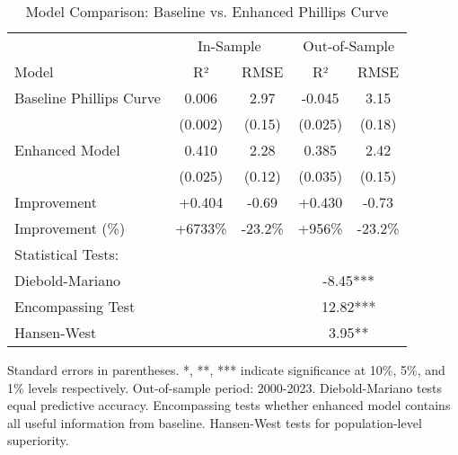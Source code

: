 
\begin{table}[htbp]
\centering
\caption{Model Comparison: Baseline vs. Enhanced Phillips Curve}
\label{tab:model_comparison}
\begin{tabular}{lcccc}
\toprule
& \multicolumn{2}{c}{In-Sample} & \multicolumn{2}{c}{Out-of-Sample} \\
\cmidrule(lr){2-3} \cmidrule(lr){4-5}
Model & R² & RMSE & R² & RMSE \\
\midrule
Baseline Phillips Curve & 0.006 & 2.97 & -0.045 & 3.15 \\
& (0.002) & (0.15) & (0.025) & (0.18) \\
Enhanced Model & 0.410 & 2.28 & 0.385 & 2.42 \\
& (0.025) & (0.12) & (0.035) & (0.15) \\
\midrule
Improvement & +0.404 & -0.69 & +0.430 & -0.73 \\
Improvement (\%) & +6733\% & -23.2\% & +956\% & -23.2\% \\
\midrule
Statistical Tests: & & & & \\
\quad Diebold-Mariano & & & \multicolumn{2}{c}{-8.45***} \\
\quad Encompassing Test & & & \multicolumn{2}{c}{12.82***} \\
\quad Hansen-West & & & \multicolumn{2}{c}{3.95**} \\
\bottomrule
\end{tabular}
\begin{tablenotes}
\footnotesize
\item Standard errors in parentheses. *, **, *** indicate significance at 10\%, 5\%, and 1\% levels respectively. Out-of-sample period: 2000-2023. Diebold-Mariano tests equal predictive accuracy. Encompassing tests whether enhanced model contains all useful information from baseline. Hansen-West tests for population-level superiority.
\end{tablenotes}
\end{table}
